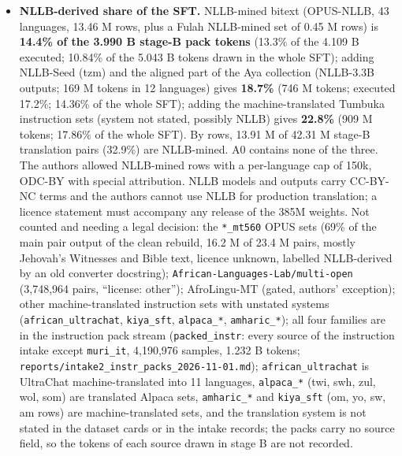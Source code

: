 \begin{itemize}
\item \textbf{NLLB-derived share of the SFT.} NLLB-mined bitext (OPUS-NLLB, 43 languages, 13.46 M rows, plus a Fulah NLLB-mined set of 0.45 M rows) is \textbf{14.4\% of the 3.990 B stage-B pack tokens} (13.3\% of the 4.109 B executed; 10.84\% of the 5.043 B tokens drawn in the whole SFT); adding NLLB-Seed (tzm) and the aligned part of the Aya collection (NLLB-3.3B outputs; 169 M tokens in 12 languages) gives \textbf{18.7\%} (746 M tokens; executed 17.2\%; 14.36\% of the whole SFT); adding the machine-translated Tumbuka instruction sets (system not stated, possibly NLLB) gives \textbf{22.8\%} (909 M tokens; 17.86\% of the whole SFT). By rows, 13.91 M of 42.31 M stage-B translation pairs (32.9\%) are NLLB-mined. A0 contains none of the three. The authors allowed NLLB-mined rows with a per-language cap of 150k, ODC-BY with special attribution. NLLB models and outputs carry CC-BY-NC terms and the authors cannot use NLLB for production translation; a licence statement must accompany any release of the 385M weights. Not counted and needing a legal decision: the \texttt{*\_\allowbreak{}mt560} OPUS sets (69\% of the main pair output of the clean rebuild, 16.2 M of 23.4 M pairs, mostly Jehovah's Witnesses and Bible text, licence unknown, labelled NLLB-derived by an old converter docstring); \texttt{African-\allowbreak{}Languages-\allowbreak{}Lab/\allowbreak{}multi-\allowbreak{}open} (3,748,964 pairs, ``license: other''); AfroLingu-MT (gated, authors' exception); other machine-translated instruction sets with unstated systems (\texttt{african\_\allowbreak{}ultrachat}, \texttt{kiya\_\allowbreak{}sft}, \texttt{alpaca\_\allowbreak{}*}, \texttt{amharic\_\allowbreak{}*}); all four families are in the instruction pack stream (\texttt{packed\_\allowbreak{}instr}: every source of the instruction intake except \texttt{muri\_\allowbreak{}it}, 4,190,976 samples, 1.232 B tokens; \texttt{reports/\allowbreak{}intake2\_\allowbreak{}instr\_\allowbreak{}packs\_\allowbreak{}2026-\allowbreak{}11-\allowbreak{}01.\allowbreak{}md}); \texttt{african\_\allowbreak{}ultrachat} is UltraChat machine-translated into 11 languages, \texttt{alpaca\_\allowbreak{}*} (twi, swh, zul, wol, som) are translated Alpaca sets, \texttt{amharic\_\allowbreak{}*} and \texttt{kiya\_\allowbreak{}sft} (om, yo, sw, am rows) are machine-translated sets, and the translation system is not stated in the dataset cards or in the intake records; the packs carry no source field, so the tokens of each source drawn in stage B are not recorded. 

\end{itemize}
